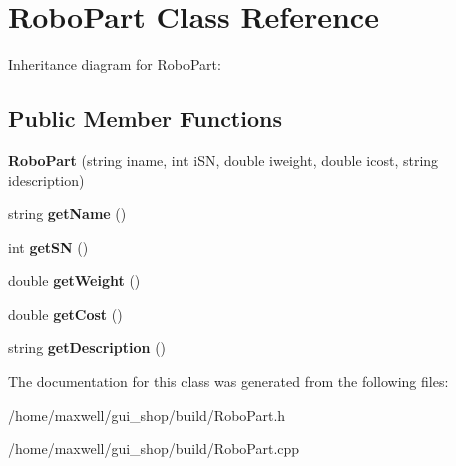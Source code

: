\hypertarget{classRoboPart}{}\section{Robo\+Part Class Reference}
\label{classRoboPart}


Inheritance diagram for Robo\+Part\+:
\subsection*{Public Member Functions}
\begin{DoxyCompactItemize}
\item 
{\bfseries Robo\+Part} (string iname, int i\+SN, double iweight, double icost, string idescription)\hypertarget{classRoboPart_ad0a9fb48cbe96b0676c75b42406e1589}{}\label{classRoboPart_ad0a9fb48cbe96b0676c75b42406e1589}

\item 
string {\bfseries get\+Name} ()\hypertarget{classRoboPart_a15e14aabad982b0ce7814f7967cbdb33}{}\label{classRoboPart_a15e14aabad982b0ce7814f7967cbdb33}

\item 
int {\bfseries get\+SN} ()\hypertarget{classRoboPart_ac098652b1b51c6c2a96fcacc50b39461}{}\label{classRoboPart_ac098652b1b51c6c2a96fcacc50b39461}

\item 
double {\bfseries get\+Weight} ()\hypertarget{classRoboPart_a73201f11b77c9625e1b352402b9dc304}{}\label{classRoboPart_a73201f11b77c9625e1b352402b9dc304}

\item 
double {\bfseries get\+Cost} ()\hypertarget{classRoboPart_a502e942ceb687853f3b97a2d98e13295}{}\label{classRoboPart_a502e942ceb687853f3b97a2d98e13295}

\item 
string {\bfseries get\+Description} ()\hypertarget{classRoboPart_a8672f56c5dfd869000707aaa9f90b6ea}{}\label{classRoboPart_a8672f56c5dfd869000707aaa9f90b6ea}

\end{DoxyCompactItemize}


The documentation for this class was generated from the following files\+:\begin{DoxyCompactItemize}
\item 
/home/maxwell/gui\+\_\+shop/build/Robo\+Part.\+h\item 
/home/maxwell/gui\+\_\+shop/build/Robo\+Part.\+cpp\end{DoxyCompactItemize}
